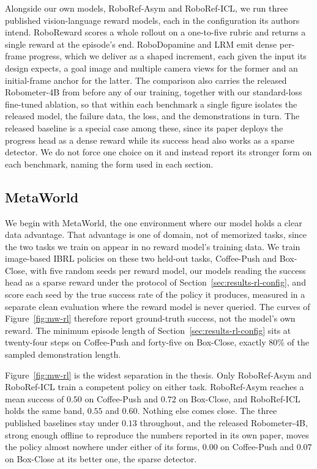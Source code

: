 Alongside our own models, RoboRef-Asym and RoboRef-ICL, we run three published vision-language reward models, each in the configuration its authors intend. RoboReward \citep{roboreward} scores a whole rollout on a one-to-five rubric and returns a single reward at the episode's end. RoboDopamine \citep{robodopamine} and LRM \citep{TRI-reward-model} emit dense per-frame progress, which we deliver as a shaped increment, each given the input its design expects, a goal image and multiple camera views for the former and an initial-frame anchor for the latter. The comparison also carries the released Robometer-4B from before any of our training, together with our standard-loss fine-tuned ablation, so that within each benchmark a single figure isolates the released model, the failure data, the loss, and the demonstrations in turn. The released baseline is a special case among these, since its paper deploys the progress head as a dense reward while its success head also works as a sparse detector. We do not force one choice on it and instead report its stronger form on each benchmark, naming the form used in each section.

\subsection{MetaWorld}
\label{sec:results-rl-mw}

We begin with MetaWorld, the one environment where our model holds a clear data advantage. That advantage is one of domain, not of memorized tasks, since the two tasks we train on appear in no reward model's training data. We train image-based IBRL policies on these two held-out tasks, Coffee-Push and Box-Close, with five random seeds per reward model, our models reading the success head as a sparse reward under the protocol of Section~\ref{sec:results-rl-config}, and score each seed by the true success rate of the policy it produces, measured in a separate clean evaluation where the reward model is never queried. The curves of Figure~\ref{fig:mw-rl} therefore report ground-truth success, not the model's own reward. The minimum episode length of Section~\ref{sec:results-rl-config} sits at twenty-four steps on Coffee-Push and forty-five on Box-Close, exactly 80\% of the sampled demonstration length.

Figure~\ref{fig:mw-rl} is the widest separation in the thesis. Only RoboRef-Asym and RoboRef-ICL train a competent policy on either task. RoboRef-Asym reaches a mean success of $0.50$ on Coffee-Push and $0.72$ on Box-Close, and RoboRef-ICL holds the same band, $0.55$ and $0.60$. Nothing else comes close. The three published baselines stay under $0.13$ throughout, and the released Robometer-4B, strong enough offline to reproduce the numbers reported in its own paper, moves the policy almost nowhere under either of its forms, $0.00$ on Coffee-Push and $0.07$ on Box-Close at its better one, the sparse detector.

